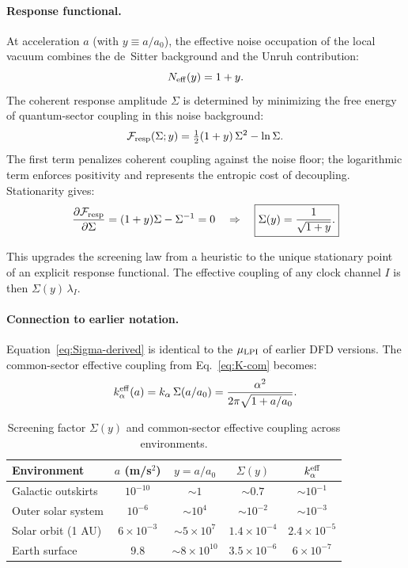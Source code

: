 \paragraph{Response functional.}
At acceleration $a$ (with $y \equiv a/a_0$), the effective noise occupation of the local vacuum combines the de~Sitter background and the Unruh contribution:
\begin{equation}\label{eq:N-eff}
N_{\rm eff}(y) = 1 + y.
\end{equation}
The coherent response amplitude $\Sigma$ is determined by minimizing the free energy of quantum-sector coupling in this noise background:
\begin{equation}\label{eq:F-resp}
\mathcal{F}_{\rm resp}(\Sigma;y) = \tfrac{1}{2}(1+y)\,\Sigma^2 - \ln\Sigma.
\end{equation}
The first term penalizes coherent coupling against the noise floor; the logarithmic term enforces positivity and represents the entropic cost of decoupling.  Stationarity gives:
\begin{equation}
\frac{\partial\mathcal{F}_{\rm resp}}{\partial\Sigma} = (1+y)\Sigma - \Sigma^{-1} = 0
\quad\Rightarrow\quad
\boxed{\Sigma(y) = \frac{1}{\sqrt{1+y}}.}
\label{eq:Sigma-derived}
\end{equation}

This upgrades the screening law from a heuristic to the unique stationary point of an explicit response functional.  The effective coupling of any clock channel $I$ is then $\Sigma(y)\,\lambda_I$.

\paragraph{Connection to earlier notation.}
Equation~\eqref{eq:Sigma-derived} is identical to the $\mu_{\rm LPI}$ of earlier DFD versions.  The common-sector effective coupling from Eq.~\eqref{eq:K-com} becomes:
\begin{equation}\label{eq:kalpha-eff}
k_\alpha^{\rm eff}(a) = k_\alpha\,\Sigma(a/a_0) = \frac{\alpha^2}{2\pi\sqrt{1+a/a_0}}.
\end{equation}

\begin{table}[h]
\centering
\caption{Screening factor $\Sigma(y)$ and common-sector effective coupling across environments.}
\label{tab:regime-coupling}
\renewcommand{\arraystretch}{1.15}
\small
\begin{tabular}{@{}lcccc@{}}
\toprule
Environment & $a$ (m/s$^2$) & $y=a/a_0$ & $\Sigma(y)$ & $k_\alpha^{\rm eff}$ \\
\midrule
Galactic outskirts & $10^{-10}$ & $\sim 1$ & $\sim 0.7$ & $\sim 10^{-1}$ \\
Outer solar system & $10^{-6}$ & $\sim 10^4$ & $\sim 10^{-2}$ & $\sim 10^{-3}$ \\
Solar orbit (1 AU) & $6\times10^{-3}$ & $\sim 5\times10^7$ & $1.4\times10^{-4}$ & $2.4\times10^{-5}$ \\
Earth surface & $9.8$ & $\sim 8\times10^{10}$ & $3.5\times10^{-6}$ & $6\times10^{-7}$ \\
\bottomrule
\end{tabular}
\end{table}

